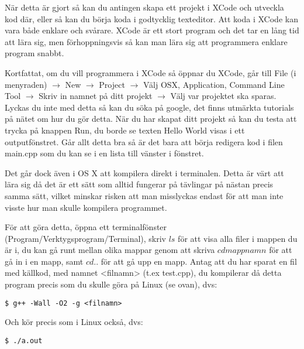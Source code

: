 När detta är gjort så kan du antingen skapa ett projekt i XCode och utveckla kod där, eller så kan du börja koda i godtycklig texteditor.
Att koda i XCode kan vara både enklare och svårare. XCode är ett stort program och det tar en lång tid att lära sig, men förhoppningsvis så kan man lära sig att programmera enklare program snabbt.

Kortfattat, om du vill programmera i XCode så öppnar du XCode, går till File (i menyraden) $\rightarrow$ New $\rightarrow$ Project $\rightarrow$ Välj OSX, Application, Command Line Tool $\rightarrow$ Skriv in namnet på ditt projekt $\rightarrow$ Välj var projektet ska sparas. Lyckas du inte med detta så kan du söka på google, det finns utmärkta tutorials på nätet om hur du gör detta. När du har skapat ditt projekt så kan du testa att trycka på knappen Run, du borde se texten Hello World visas i ett outputfönstret. Går allt detta bra så är det bara att börja redigera kod i filen main.cpp som du kan se i en lista till vänster i fönstret.

Det går dock även i OS X att kompilera direkt i terminalen. Detta är värt att lära sig då det är ett sätt som alltid fungerar på tävlingar på nästan precis samma sätt, vilket minskar risken att man misslyckas endast för att man inte visste hur man skulle kompilera programmet.

För att göra detta, öppna ett terminalfönster (Program/Verktygsprogram/Terminal), skriv $ls$ för att visa alla filer i mappen du är i, du kan gå runt mellan olika mappar genom att skriva $cd mappnamn$ för att gå in i en mapp, samt $cd ..$ för att gå upp en mapp.
Antag att du har sparat en fil med källkod, med namnet <filnamn> (t.ex test.cpp), du kompilerar då detta program precis som du skulle göra på Linux (se ovan), dvs:

\texttt{\$ g++ -Wall -O2 -g <filnamn>}

Och kör precis som i Linux också, dvs:

\texttt{\$ ./a.out}